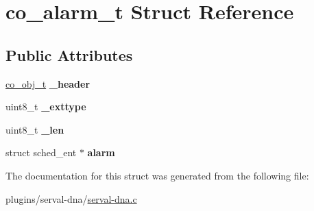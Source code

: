 \hypertarget{structco__alarm__t}{\section{co\-\_\-alarm\-\_\-t Struct Reference}
\label{structco__alarm__t}
}
\subsection*{Public Attributes}
\begin{DoxyCompactItemize}
\item 
\hypertarget{structco__alarm__t_a10521d7b727aa239485cf239d4956314}{\hyperlink{structco__obj__t}{co\-\_\-obj\-\_\-t} {\bfseries \-\_\-header}}\label{structco__alarm__t_a10521d7b727aa239485cf239d4956314}

\item 
\hypertarget{structco__alarm__t_a9412dc0542f8bc5efc017eb97f062170}{uint8\-\_\-t {\bfseries \-\_\-exttype}}\label{structco__alarm__t_a9412dc0542f8bc5efc017eb97f062170}

\item 
\hypertarget{structco__alarm__t_aa2e64c17f5d086951fd1091c75441a84}{uint8\-\_\-t {\bfseries \-\_\-len}}\label{structco__alarm__t_aa2e64c17f5d086951fd1091c75441a84}

\item 
\hypertarget{structco__alarm__t_a235f538b56acb0478b1f7eacf717cc61}{struct sched\-\_\-ent $\ast$ {\bfseries alarm}}\label{structco__alarm__t_a235f538b56acb0478b1f7eacf717cc61}

\end{DoxyCompactItemize}


The documentation for this struct was generated from the following file\-:\begin{DoxyCompactItemize}
\item 
plugins/serval-\/dna/\hyperlink{serval-dna_8c}{serval-\/dna.\-c}\end{DoxyCompactItemize}
